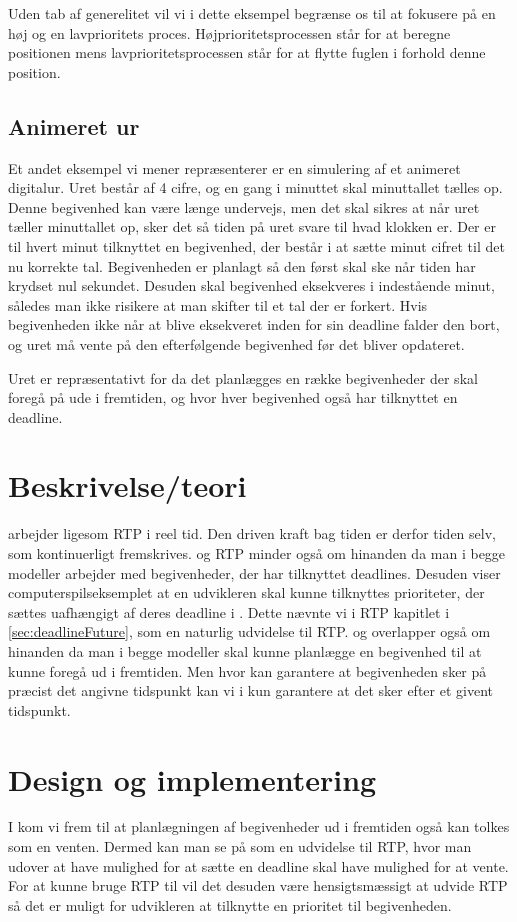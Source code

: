 Uden tab af generelitet vil vi i dette eksempel begrænse os til at fokusere på en høj og en lavprioritets proces. Højprioritetsprocessen står for at beregne positionen mens lavprioritetsprocessen står for at flytte fuglen i forhold denne position.


\subsection{Animeret ur}
Et andet eksempel vi mener repræsenterer \is er en  simulering af et animeret digitalur. Uret består af 4 cifre, og en gang i minuttet skal minuttallet tælles op. Denne begivenhed kan være længe undervejs, men det skal sikres at når uret tæller minuttallet op, sker det så tiden på uret svare til hvad klokken er.  Der er til  hvert minut tilknyttet en begivenhed, der består i at sætte minut cifret til det nu korrekte tal. Begivenheden er planlagt så den først skal ske når tiden har krydset nul sekundet. Desuden skal begivenhed eksekveres i indestående minut, således man ikke risikere at man skifter til et tal der er forkert. Hvis begivenheden ikke når at blive eksekveret inden for sin deadline falder den bort, og uret må vente på den efterfølgende begivenhed før det bliver opdateret.

Uret er repræsentativt for \is da det planlægges en række begivenheder der skal foregå på ude i fremtiden, og hvor hver begivenhed også har tilknyttet en deadline.

\section{Beskrivelse/teori}

\is arbejder ligesom RTP i reel tid. Den driven kraft bag tiden er derfor tiden selv, som kontinuerligt fremskrives. \is og RTP minder også om hinanden da man i begge modeller arbejder med begivenheder, der har tilknyttet deadlines. Desuden viser computerspilseksemplet at en  udvikleren skal kunne tilknyttes prioriteter, der sættes uafhængigt af deres deadline i \is. Dette nævnte vi i RTP kapitlet i \cref{sec:deadlineFuture}, som en naturlig udvidelse til RTP.
\is og \des overlapper også om hinanden da man i begge modeller skal kunne planlægge en begivenhed til at kunne foregå ud i fremtiden. Men hvor \des kan garantere at begivenheden sker på præcist det angivne tidspunkt kan vi i \is kun garantere at det sker efter et givent tidspunkt.

\section{Design og implementering}
I \des kom vi frem til at planlægningen af begivenheder ud i fremtiden også kan tolkes som en venten. Dermed kan man se på \is som en udvidelse til RTP, hvor man udover at have mulighed for at sætte en deadline skal have mulighed for at vente. For at kunne bruge RTP til \is vil det desuden være hensigtsmæssigt at  udvide RTP så det er muligt for udvikleren at tilknytte en prioritet til begivenheden.

